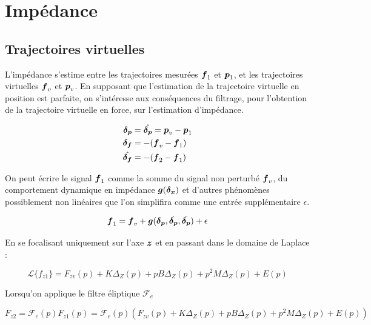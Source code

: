 \documentclass[12pt, a4paper]{article} %
\numberwithin{equation}{section}
\begin{document}
	
	\section{Impédance}	
	
	\subsection{Trajectoires virtuelles}
	
	L'impédance s'estime entre les trajectoires mesurées $ \vect{f}_1 $ et $ \vect{p}_1 $, et les trajectoires virtuelles  $ \vect{f}_v $ et $ \vect{p}_v $. En supposant que l'estimation de la trajectoire virtuelle en position est parfaite, on s'intéresse aux conséquences du filtrage, pour l'obtention de la trajectoire virtuelle en force, sur l'estimation d'impédance.
	
	\begin{equation} \label{differential_pose_force}
		\begin{split}
			\vect{\delta_p} &= \hat{\vect{\delta_p}} = \vect{p}_v - \vect{p}_1 \\
			\vect{\delta_f} &= -(\vect{f}_v - \vect{f}_1) \\
			\hat{\vect{\delta_f}} &= -(\vect{f}_2 - \vect{f}_1) \\
		\end{split}
	\end{equation}
	
	On peut écrire le signal $ \vect{f}_1 $ comme la somme du signal non perturbé $ \vect{f}_v $, du comportement dynamique en impédance $ \vect{g}(\vect{\delta_x}) $ et d'autres phénomènes possiblement non linéaires que l'on simplifira comme une entrée supplémentaire $ \epsilon $.
	
	\begin{equation} %
		\vect{f}_1 = \vect{f}_v + \vect{g}(\vect{\delta_p}, \dot{\vect{\delta_p}}, \ddot{\vect{\delta_p}}) + \epsilon
	\end{equation}
	
	En se focalisant uniquement sur l'axe $ \vect{z} $ et en passant dans le domaine de Laplace :
	
	\begin{equation} %
		\mathcal{L}\{f_{z1}\} = F_{zv}(p) + K\Delta_Z(p) + p B\Delta_Z(p) + p^2 M\Delta_Z(p) + E(p)
	\end{equation}
	
	Lorsqu'on applique le filtre éliptique $ \mathcal{F}_e $
	
	\begin{equation} %
		F_{z2} = \mathcal{F}_e(p)F_{z1}(p) = \mathcal{F}_e(p) (F_{zv}(p) + K\Delta_Z(p) + p B\Delta_Z(p) + p^2 M\Delta_Z(p) + E(p))
	\end{equation}
	
\end{document}
